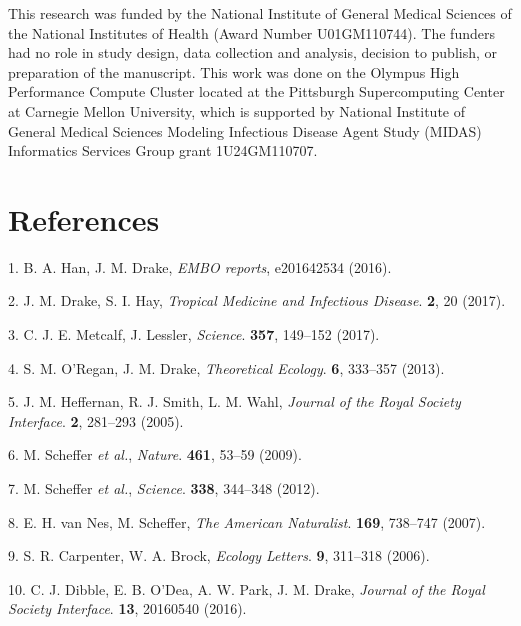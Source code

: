 \documentclass[3p]{elsarticle} %
\begin{document}
This research was funded by the National Institute of General Medical
Sciences of the National Institutes of Health (Award Number
U01GM110744). The funders had no role in study design, data collection
and analysis, decision to publish, or preparation of the manuscript.
This work was done on the Olympus High Performance Compute Cluster
located at the Pittsburgh Supercomputing Center at Carnegie Mellon
University, which is supported by National Institute of General Medical
Sciences Modeling Infectious Disease Agent Study (MIDAS) Informatics
Services Group grant 1U24GM110707.

\hypertarget{references}{%
\section*{References}\label{references}}

\hypertarget{refs}{}
\leavevmode\hypertarget{ref-Han2016}{}%
1. B. A. Han, J. M. Drake, \emph{EMBO reports}, e201642534 (2016).

\leavevmode\hypertarget{ref-Drake2017}{}%
2. J. M. Drake, S. I. Hay, \emph{Tropical Medicine and Infectious
Disease}. \textbf{2}, 20 (2017).

\leavevmode\hypertarget{ref-Metcalf2017}{}%
3. C. J. E. Metcalf, J. Lessler, \emph{Science}. \textbf{357}, 149--152
(2017).

\leavevmode\hypertarget{ref-ORegan2013}{}%
4. S. M. O'Regan, J. M. Drake, \emph{Theoretical Ecology}. \textbf{6},
333--357 (2013).

\leavevmode\hypertarget{ref-Heffernan2005}{}%
5. J. M. Heffernan, R. J. Smith, L. M. Wahl, \emph{Journal of the Royal
Society Interface}. \textbf{2}, 281--293 (2005).

\leavevmode\hypertarget{ref-Scheffer2009}{}%
6. M. Scheffer \emph{et al.}, \emph{Nature}. \textbf{461}, 53--59
(2009).

\leavevmode\hypertarget{ref-Scheffer2012}{}%
7. M. Scheffer \emph{et al.}, \emph{Science}. \textbf{338}, 344--348
(2012).

\leavevmode\hypertarget{ref-VanNes2007}{}%
8. E. H. van Nes, M. Scheffer, \emph{The American Naturalist}.
\textbf{169}, 738--747 (2007).

\leavevmode\hypertarget{ref-Carpenter2006}{}%
9. S. R. Carpenter, W. A. Brock, \emph{Ecology Letters}. \textbf{9},
311--318 (2006).

\leavevmode\hypertarget{ref-Dibble2016}{}%
10. C. J. Dibble, E. B. O'Dea, A. W. Park, J. M. Drake, \emph{Journal of
the Royal Society Interface}. \textbf{13}, 20160540 (2016).
\end{document}
